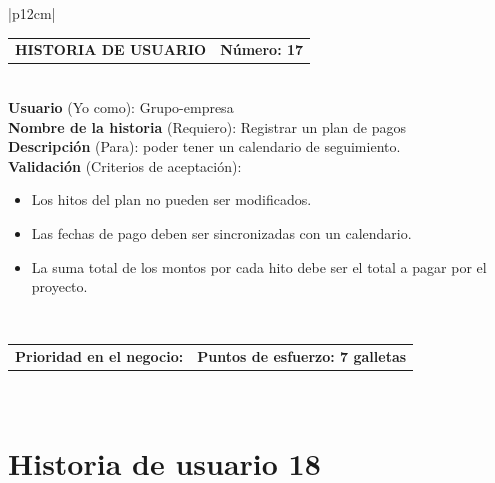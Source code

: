 \documentclass[11pt,letterpaper]{report}
\begin{document}
	\begin{center}	
		\begin{tabular}{|p{12cm}|}
			\hline
			\begin{tabular}{c|c}
				\textbf{HISTORIA DE USUARIO} & \textbf{Número: 17} \\
			\end{tabular} \\ \hline
			\textbf{Usuario} (Yo como): Grupo-empresa \\ \hline
			\textbf{Nombre de la historia} (Requiero): Registrar un plan de pagos \\ \hline
			\textbf{Descripción} (Para): poder tener un calendario de seguimiento. \\ \hline
			\textbf{Validación} (Criterios de aceptación): \\
			\begin{minipage}{12cm}
				\begin{itemize}
					\item Los hitos del plan no pueden ser modificados.
					\item Las fechas de pago deben ser sincronizadas con un calendario.
					\item La suma total de los montos por cada hito debe ser el total a pagar por el proyecto.
				\end{itemize}
			\end{minipage} \\ \hline
			\begin{tabular}{p{6cm}|c}
				\textbf{Prioridad en el negocio: } & \textbf{Puntos de esfuerzo: 7 galletas} \\
			\end{tabular} \\ \hline
		\end{tabular}
	\end{center}
	
	\section{Historia de usuario 18}
	
\end{document}
